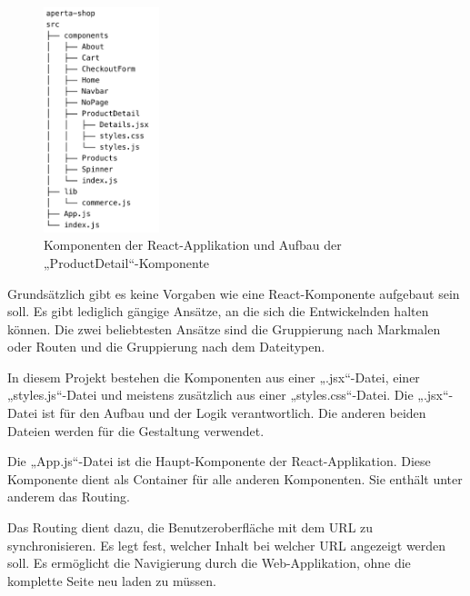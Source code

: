 \begin{figure}[H]
  \centering
  \includegraphics[width=0.3\textwidth]{pics/react-komponentenstruktur.png}
  \caption{Komponenten der React-Applikation und Aufbau der „ProductDetail“-Komponente}
\end{figure}

Grundsätzlich gibt es keine Vorgaben wie eine React-Komponente aufgebaut sein soll. Es gibt lediglich gängige Ansätze, an die sich die Entwickelnden halten können. Die zwei beliebtesten Ansätze sind die Gruppierung nach Markmalen oder Routen und die Gruppierung nach dem Dateitypen.
\cite{reactComponents}

In diesem Projekt bestehen die Komponenten aus einer „.jsx“-Datei, einer „styles.js“-Datei und meistens zusätzlich aus einer „styles.css“-Datei. Die „.jsx“-Datei ist für den Aufbau und der Logik verantwortlich. Die anderen beiden Dateien werden für die Gestaltung verwendet.

Die „App.js“-Datei ist die Haupt-Komponente der React-Applikation. Diese Komponente dient als Container für alle anderen Komponenten. Sie enthält unter anderem das Routing.
\cite{appJS}

Das Routing dient dazu, die Benutzeroberfläche mit dem URL zu synchronisieren. Es legt fest, welcher Inhalt bei welcher URL angezeigt werden soll. Es ermöglicht die Navigierung durch die Web-Applikation, ohne die komplette Seite neu laden zu müssen. 
\cite{reactRouting}

